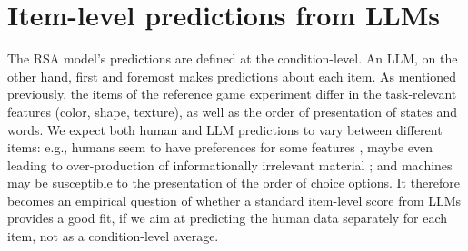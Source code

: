 \documentclass[fleqn]{article}
\begin{document}
\section{Item-level predictions from LLMs}
\label{sec:item-level-pred}

The RSA model's predictions are defined at the condition-level.
An LLM, on the other hand, first and foremost makes predictions about each item.
As mentioned previously, the items of the reference game experiment differ in the task-relevant features (color, shape, texture), as well as the order of presentation of states and words.
We expect both human and LLM predictions to vary between different items: e.g., humans seem to have preferences for some features \citep[e.g.,][]{QingFranke2013:Variations-on-a}, maybe even leading to over-production of informationally irrelevant material \citep[e.g.,][]{DegenHawkins2020:When-redundancy} ; and machines may be susceptible to the presentation of the order of choice options. 
It therefore becomes an empirical question of whether a standard item-level score from LLMs provides a good fit, if we aim at predicting the human data separately for each item, not as a condition-level average.
\end{document}
